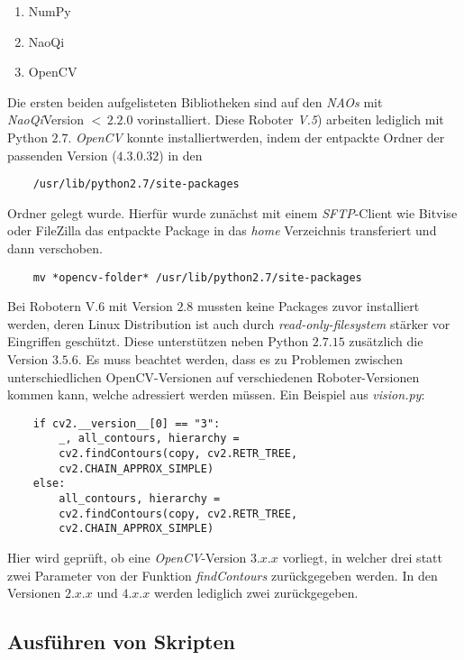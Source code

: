 \begin{enumerate}
    \item NumPy
    \item NaoQi
    \item OpenCV
\end{enumerate}

Die ersten beiden aufgelisteten Bibliotheken sind auf den \textit{NAOs} mit \textit{NaoQi}Version $ < \, 2.2.0$ vorinstalliert. Diese Roboter \textit{V.5}) arbeiten lediglich mit Python $2.7$. \textit{OpenCV} konnte \dq installiert\dq werden, indem der entpackte Ordner der passenden Version ($4.3.0.32$) in den

\begin{verbatim}
    /usr/lib/python2.7/site-packages
\end{verbatim}

Ordner gelegt wurde. Hierfür wurde zunächst mit einem \textit{SFTP}-Client wie Bitvise oder FileZilla das entpackte Package in das \textit{home} Verzeichnis transferiert und dann verschoben.

\begin{verbatim}
    mv *opencv-folder* /usr/lib/python2.7/site-packages
\end{verbatim}

Bei Robotern V.6 mit Version $2.8$ mussten keine Packages zuvor installiert werden, deren Linux Distribution ist auch durch \textit{read-only-filesystem} stärker vor Eingriffen geschützt. Diese unterstützen neben Python $2.7.15$ zusätzlich die Version $3.5.6$. Es muss beachtet werden, dass es zu Problemen zwischen unterschiedlichen OpenCV-Versionen auf verschiedenen Roboter-Versionen kommen kann, welche adressiert werden müssen. Ein Beispiel aus \textit{vision.py}:

\begin{verbatim}
    if cv2.__version__[0] == "3":
        _, all_contours, hierarchy = 
        cv2.findContours(copy, cv2.RETR_TREE, 
        cv2.CHAIN_APPROX_SIMPLE)
    else:
        all_contours, hierarchy = 
        cv2.findContours(copy, cv2.RETR_TREE, 
        cv2.CHAIN_APPROX_SIMPLE)
\end{verbatim}

Hier wird geprüft, ob eine \textit{OpenCV}-Version $3.x.x$ vorliegt, in welcher drei statt zwei Parameter von der Funktion \textit{findContours} zurückgegeben werden. In den Versionen $2.x.x$ und $4.x.x$ werden lediglich zwei zurückgegeben.

\subsection{Ausführen von Skripten}

